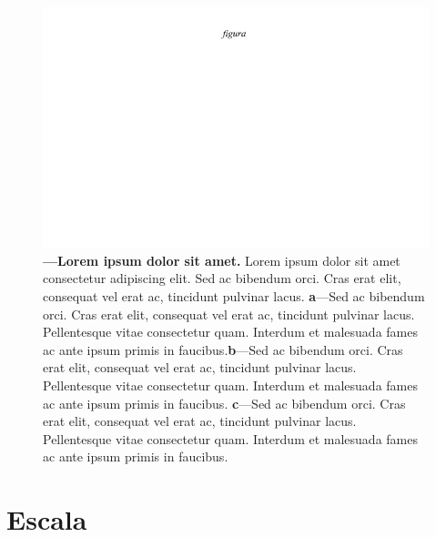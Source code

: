 \documentclass[./main.tex]{subfiles}
\begin{document}
\begin{figure}[t!] 
\centering				
\includegraphics[width=0.95\linewidth]{figs/fig_m.jpg}		
\caption[Lorem ipsum dolor sit amet]
{\textbf{---\;Lorem ipsum dolor sit amet.}
    Lorem ipsum dolor sit amet consectetur adipiscing elit. Sed ac bibendum orci. Cras erat elit, consequat vel erat ac, tincidunt pulvinar lacus. \;\textbf{a}\;---\;Sed ac bibendum orci. Cras erat elit, consequat vel erat ac, tincidunt pulvinar lacus. Pellentesque vitae consectetur quam. Interdum et malesuada fames ac ante ipsum primis in faucibus.\;\textbf{b}\;---\;Sed ac bibendum orci. Cras erat elit, consequat vel erat ac, tincidunt pulvinar lacus. Pellentesque vitae consectetur quam. Interdum et malesuada fames ac ante ipsum primis in faucibus. \;\textbf{c}\;---\;Sed ac bibendum orci. Cras erat elit, consequat vel erat ac, tincidunt pulvinar lacus. Pellentesque vitae consectetur quam. Interdum et malesuada fames ac ante ipsum primis in faucibus.
}
\label{fig:hydro:paradox} 		
\end{figure}

\section{Escala} \label{sec:hydro:scale}
\end{document}
